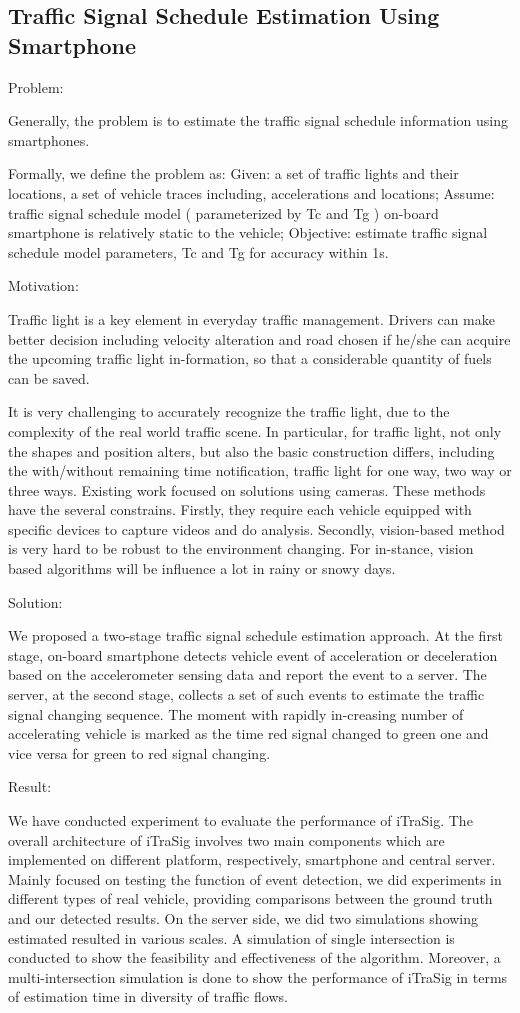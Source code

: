 \subsection{Traffic Signal Schedule Estimation Using Smartphone}

Problem:

Generally, the problem is to estimate the traffic signal schedule information using smartphones.

Formally, we define the problem as: Given: a set of traffic lights and their locations, a set of vehicle traces including, accelerations and locations; Assume: traffic signal schedule model ( parameterized by Tc and Tg ) on-board smartphone is relatively static to the vehicle; Objective: estimate traffic signal schedule model parameters, Tc and Tg for accuracy within 1s.

Motivation:

Traffic light is a key element in everyday traffic management. Drivers can make better decision including velocity alteration and road chosen if he/she can acquire the upcoming traffic light in-formation, so that a considerable quantity of fuels can be saved.

It is very challenging to accurately recognize the traffic light, due to the complexity of the real world traffic scene. In particular, for traffic light, not only the shapes and position alters, but also the basic construction differs, including the with/without remaining time notification, traffic light for one way, two way or three ways.
Existing work focused on solutions using cameras. These methods have the several constrains. Firstly, they require each vehicle equipped with specific devices to capture videos and do analysis. Secondly, vision-based method is very hard to be robust to the environment changing. For in-stance, vision based algorithms will be influence a lot in rainy or snowy days.

Solution:

We proposed a two-stage traffic signal schedule estimation approach. At the first stage, on-board smartphone detects vehicle event of acceleration or deceleration based on the accelerometer sensing data and report the event to a server. The server, at the second stage, collects a set of such events to estimate the traffic signal changing sequence. The moment with rapidly in-creasing number of accelerating vehicle is marked as the time red signal changed to green one and vice versa for green to red signal changing.

Result:

We have conducted experiment to evaluate the performance of iTraSig. The overall architecture of iTraSig involves two main components which are implemented on different platform, respectively, smartphone and central server. Mainly focused on testing the function of event detection, we did experiments in different types of real vehicle, providing comparisons between the ground truth and our detected results. On the server side, we did two simulations showing estimated resulted in various scales. A simulation of single intersection is conducted to show the feasibility and effectiveness of the algorithm. Moreover, a multi-intersection simulation is done to show the performance of iTraSig in terms of estimation time in diversity of traffic flows.